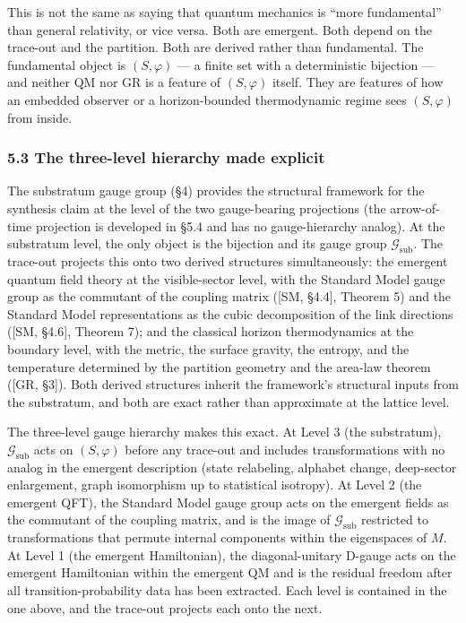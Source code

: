 \documentclass[
]{article}
\begin{document}
This is not the same as saying that quantum mechanics is ``more
fundamental'' than general relativity, or vice versa. Both are emergent.
Both depend on the trace-out and the partition. Both are derived rather
than fundamental. The fundamental object is \((S, \varphi)\) --- a
finite set with a deterministic bijection --- and neither QM nor GR is a
feature of \((S, \varphi)\) itself. They are features of how an embedded
observer or a horizon-bounded thermodynamic regime sees \((S, \varphi)\)
from inside.

\hypertarget{the-three-level-hierarchy-made-explicit}{%
\subsubsection{5.3 The three-level hierarchy made
explicit}\label{the-three-level-hierarchy-made-explicit}}

The substratum gauge group (§4) provides the structural framework for
the synthesis claim at the level of the two gauge-bearing projections
(the arrow-of-time projection is developed in §5.4 and has no
gauge-hierarchy analog). At the substratum level, the only object is the
bijection and its gauge group \(\mathcal{G}_{\text{sub}}\). The
trace-out projects this onto two derived structures simultaneously: the
emergent quantum field theory at the visible-sector level, with the
Standard Model gauge group as the commutant of the coupling matrix
({[}SM, §4.4{]}, Theorem 5) and the Standard Model representations as
the cubic decomposition of the link directions ({[}SM, §4.6{]}, Theorem
7); and the classical horizon thermodynamics at the boundary level, with
the metric, the surface gravity, the entropy, and the temperature
determined by the partition geometry and the area-law theorem ({[}GR,
§3{]}). Both derived structures inherit the framework's structural
inputs from the substratum, and both are exact rather than approximate
at the lattice level.

The three-level gauge hierarchy makes this exact. At Level 3 (the
substratum), \(\mathcal{G}_{\text{sub}}\) acts on \((S, \varphi)\)
before any trace-out and includes transformations with no analog in the
emergent description (state relabeling, alphabet change, deep-sector
enlargement, graph isomorphism up to statistical isotropy). At Level 2
(the emergent QFT), the Standard Model gauge group acts on the emergent
fields as the commutant of the coupling matrix, and is the image of
\(\mathcal{G}_{\text{sub}}\) restricted to transformations that permute
internal components within the eigenspaces of \(M\). At Level 1 (the
emergent Hamiltonian), the diagonal-unitary D-gauge acts on the emergent
Hamiltonian within the emergent QM and is the residual freedom after all
transition-probability data has been extracted. Each level is contained
in the one above, and the trace-out projects each onto the next.
\end{document}
